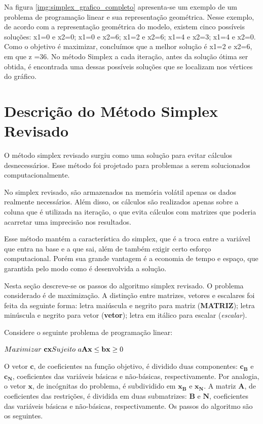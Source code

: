Na figura \ref{img:simplex_grafico_completo} apresenta-se um exemplo de um problema de programação linear e sua representação geométrica. Nesse exemplo, de acordo com a representação geométrica do modelo, existem cinco possíveis soluções: x1=0 e  x2=0; x1=0 e  x2=6; x1=2 e  x2=6; x1=4 e  x2=3; x1=4 e x2=0. Como o objetivo é maximizar, concluímos que a melhor solução é x1=2 e  x2=6, em que z =36. No método Simplex a cada iteração, antes da solução ótima ser obtida, é encontrada uma dessas possíveis soluções que se localizam nos vértices do gráfico.

\section{Descrição do Método Simplex Revisado}
O método simplex revisado surgiu como uma solução para evitar cálculos desnecessários. Esse método foi projetado para problemas a serem solucionados computacionalmente.

No simplex revisado, são armazenados na memória volátil apenas os dados realmente necessários. Além disso, os cálculos são realizados apenas sobre a coluna que é utilizada na iteração, o que evita cálculos com matrizes que poderia acarretar uma imprecisão nos resultados.

Esse método mantém a característica do simplex, que é a troca entre a variável que entra na base e a que sai, além de também exigir certo esforço computacional. Porém sua grande vantagem é a economia de tempo e espaço, que garantida pelo modo como é desenvolvida a solução. 

Nesta seção descreve-se os passos do algoritmo simplex revisado. O problema considerado é de maximização. A distinção entre matrizes, vetores e escalares foi feita da seguinte forma: letra maiúscula e negrito para matriz (\textbf{MATRIZ}); letra minúscula e negrito para vetor (\textbf{vetor}); letra em itálico para escalar (\textit{escalar}).

Considere o seguinte problema de programação linear:

$\\
Maximizar\ \mathbf{cx} \\
Sujeito\ a \\
\mathbf{Ax} \leq \mathbf{b} \\
\mathbf{x} \geq0$

O vetor $\mathbf{c}$, de coeficientes na função objetivo, é dividido duas componentes: $\mathbf{c{_B}}$ e $\mathbf{c{_N}}$, coeficientes das variáveis básicas e não-básicas, respectivamente. Por analogia, o vetor $\mathbf{x}$, de incógnitas do problema, é subdividido em $\mathbf{x{_B}}$ e $\mathbf{x{_N}}$.  A matriz $\mathbf{A}$, de coeficientes das restrições, é dividida em duas submatrizes: $\mathbf{B}$ e $\mathbf{N}$, coeficientes das variáveis básicas e não-básicas, respectivamente. Os passos do algoritmo são os seguintes.\\

